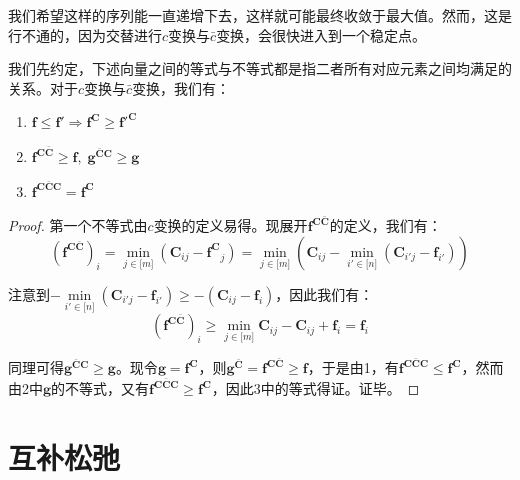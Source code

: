 \documentclass[cn,10pt,math=newtx,citestyle=gb7714-2015,bibstyle=gb7714-2015]{elegantbook}
\begin{document}
我们希望这样的序列能一直递增下去，这样就可能最终收敛于最大值。然而，这是行不通的，因为交替进行$c$变换与$\bar c$变换，会很快进入到一个稳定点。

\begin{proposition}
我们先约定，下述向量之间的等式与不等式都是指二者所有对应元素之间均满足的关系。对于$c$变换与$\bar c$变换，我们有：

\begin{enumerate}
    \item $\mathbf{f}\leq \mathbf{f}' \Rightarrow \mathbf{f^C}\geq \mathbf{f}'^{\mathbf{C}}$
    \item $\mathbf{f^{C\bar C}}\geq \mathbf{f},\; \mathbf{g}^{\bar{\mathbf{C}}\mathbf{C}}\geq \mathbf{g}$
    \item $\mathbf{f^{C\bar{C}C}}=\mathbf{f^C}$
\end{enumerate}
\end{proposition}

\begin{proof}
第一个不等式由$c$变换的定义易得。现展开$\mathbf{f^{C\bar C}}$的定义，我们有：
\begin{equation*}
    \left(\mathbf{f^{C\bar C}}\right)_i = \min\limits_{j\in\mathbb{[}m\mathbb{]}} \left(\mathbf{C}_{ij}-\mathbf{f^C}_j\right) = \min\limits_{j\in\mathbb{[}m\mathbb{]}}\left( \mathbf{C}_{ij}- \min\limits_{i'\in\mathbb{[}n\mathbb{]}}\left(\mathbf{C}_{i'j}-\mathbf{f}_{i'}\right) \right)
\end{equation*}

注意到$- \min\limits_{i'\in\mathbb{[}n\mathbb{]}}\left(\mathbf{C}_{i'j}-\mathbf{f}_{i'}\right)\geq - \left(\mathbf{C}_{ij}-\mathbf{f}_{i}\right)$，因此我们有：
\begin{equation*}
    \left(\mathbf{f^{C\bar C}}\right)_i \geq \min\limits_{j\in\mathbb{[}m\mathbb{]}} \mathbf{C}_{ij}-\mathbf{C}_{ij}+\mathbf{f}_i = \mathbf{f}_i
\end{equation*}

同理可得$\mathbf{g}^{\bar{\mathbf{C}}\mathbf{C}}\geq \mathbf{g}$。现令$\mathbf{g}=\mathbf{f^C}$，则$\mathbf{g^{\bar C}}=\mathbf{f^{C \bar C}}\geq \mathbf{f}$，于是由1，有$\mathbf{f^{C\bar{C}C}}\leq \mathbf{f^C}$，然而由2中$\mathbf{g}$的不等式，又有$\mathbf{f^{C\bar{C}C}}\geq \mathbf{f^C}$，因此3中的等式得证。证毕。
\end{proof}

\section{互补松弛}
\end{document}
